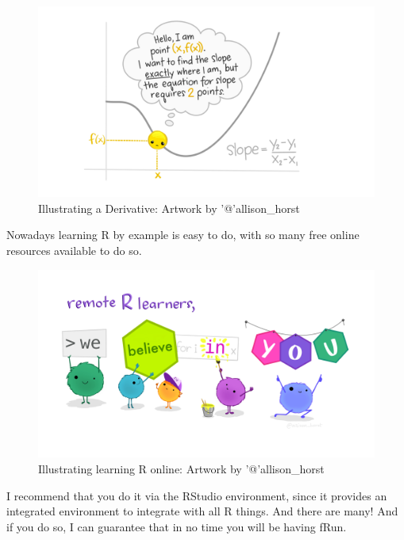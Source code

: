 \documentclass[
]{article}
\begin{document}
\begin{figure}
\centering
\includegraphics{extfiles/derivative_1.jpg}
\caption{Illustrating a Derivative: Artwork by '@'allison\_horst}
\end{figure}

Nowadays learning R by example is easy to do, with so many free online
resources available to do so.

\begin{figure}
\centering
\includegraphics{extfiles/monster_support.jpg}
\caption{Illustrating learning R online: Artwork by '@'allison\_horst}
\end{figure}

I recommend that you do it via the RStudio environment, since it
provides an integrated environment to integrate with all R things. And
there are many! And if you do so, I can guarantee that in no time you
will be having fRun.
\end{document}
